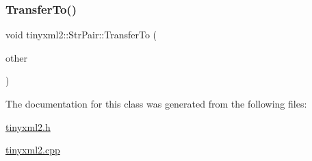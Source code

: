 \mbox{\label{classtinyxml2_1_1_str_pair_a35f795b1557fe5fdcbd93d3cc5d6b939}} 
\subsubsection{\texorpdfstring{Transfer\+To()}{TransferTo()}}
{\footnotesize\ttfamily void tinyxml2\+::\+Str\+Pair\+::\+Transfer\+To (\begin{DoxyParamCaption}\item[{\mbox{\hyperlink{classtinyxml2_1_1_str_pair}{Str\+Pair}} $\ast$}]{other }\end{DoxyParamCaption})}



The documentation for this class was generated from the following files\+:\begin{DoxyCompactItemize}
\item 
\mbox{\hyperlink{tinyxml2_8h}{tinyxml2.\+h}}\item 
\mbox{\hyperlink{tinyxml2_8cpp}{tinyxml2.\+cpp}}\end{DoxyCompactItemize}
